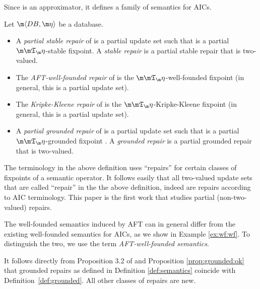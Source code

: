 Since \Ap is an approximator, it defines a family of semantics for AICs. 

\begin{definition}\label{def:semantics}
 Let $\fulldb$ be a database. 
 \begin{itemize}
  \item A \emph{partial stable repair} of \fulldb is a partial update set \UUU such that \UUU is a partial $\Ap$-stable fixpoint. A \emph{stable repair} is a partial stable repair that is two-valued. 
  \item The \emph{AFT-well-founded repair} of \fulldb is the $\Ap$-well-founded fixpoint (in general, this is a partial update set). 
  \item The \emph{Kripke-Kleene repair} of \fulldb is the $\Ap$-Kripke-Kleene fixpoint (in general, this is a partial update set). 
  \item A \emph{partial grounded repair} of \fulldb is a partial update set \UUU such that \UUU is a partial $\Ap$-grounded fixpoint . A \emph{grounded repair} is a partial grounded repair that is two-valued. 
 \end{itemize}
\end{definition}

The terminology in the above definition uses ``repairs'' for certain classes of fixpoints of a semantic operator. It follows easily that  all two-valued update sets that are called ``repair'' in the the above definition, indeed are repairs according to AIC terminology. 
This paper is the first work that studies partial (non-two-valued) repairs. 
 

The well-founded semantics induced by AFT can in general differ from the existing well-founded semantics for AICs, as we show in Example \ref{ex:wf:wf}. To distinguish the two, we use the term \emph{AFT-well-founded semantics}. %

It follows directly from Proposition 3.2 of \citet{ijcai/BogaertsVD15} and Proposition \ref{prop:grounded:ok} that grounded repairs as defined in Definition \ref{def:semantics} coincide with  Definition~\ref{def:grounded}. 
All other classes of repairs are new. 


